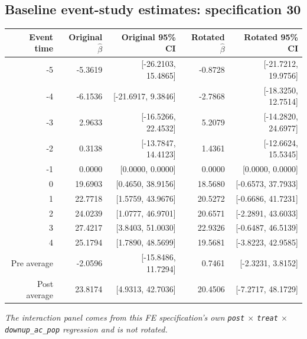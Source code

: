 \documentclass[10pt]{article}
\begin{document}
\subsection*{Baseline event-study estimates: specification 30}
\begin{center}
\scriptsize
\begin{tabular}{r rr rr}
\toprule
Event time & Original $\hat\beta$ & Original 95\% CI & Rotated $\hat\beta$ & Rotated 95\% CI \\
\midrule
-5 & -5.3619 & [-26.2103, 15.4865] & -0.8728 & [-21.7212, 19.9756] \\
-4 & -6.1536 & [-21.6917, 9.3846] & -2.7868 & [-18.3250, 12.7514] \\
-3 & 2.9633 & [-16.5266, 22.4532] & 5.2079 & [-14.2820, 24.6977] \\
-2 & 0.3138 & [-13.7847, 14.4123] & 1.4361 & [-12.6624, 15.5345] \\
-1 & 0.0000 & [0.0000, 0.0000] & 0.0000 & [0.0000, 0.0000] \\
0 & 19.6903 & [0.4650, 38.9156] & 18.5680 & [-0.6573, 37.7933] \\
1 & 22.7718 & [1.5759, 43.9676] & 20.5272 & [-0.6686, 41.7231] \\
2 & 24.0239 & [1.0777, 46.9701] & 20.6571 & [-2.2891, 43.6033] \\
3 & 27.4217 & [3.8403, 51.0030] & 22.9326 & [-0.6487, 46.5139] \\
4 & 25.1794 & [1.7890, 48.5699] & 19.5681 & [-3.8223, 42.9585] \\
\midrule
Pre average & -2.0596 & [-15.8486, 11.7294] & 0.7461 & [-2.3231, 3.8152] \\
Post average & 23.8174 & [4.9313, 42.7036] & 20.4506 & [-7.2717, 48.1729] \\
\bottomrule
\end{tabular}
\end{center}
\medskip
\textit{The interaction panel comes from this FE specification's own \texttt{post} $\times$ \texttt{treat} $\times$ \texttt{downup\_ac\_pop} regression and is not rotated.}
\clearpage
\end{document}
